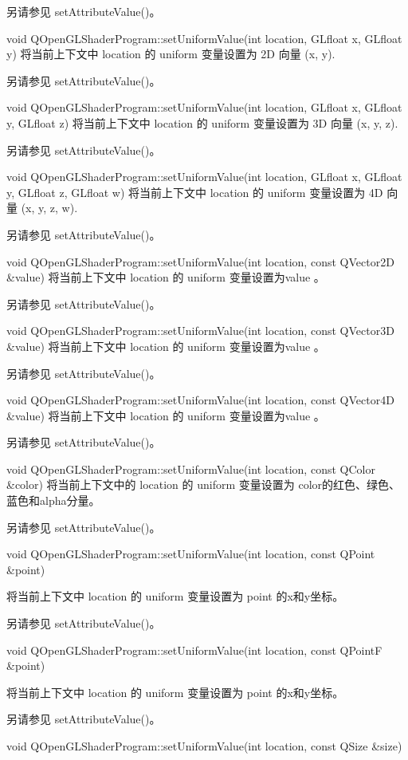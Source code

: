 另请参见 setAttributeValue()。

void QOpenGLShaderProgram::setUniformValue(int location, GLfloat x, GLfloat y)
将当前上下文中 location 的 uniform 变量设置为 2D 向量 (x, y).

另请参见 setAttributeValue()。

void QOpenGLShaderProgram::setUniformValue(int location, GLfloat x, GLfloat y, GLfloat z)
将当前上下文中 location 的 uniform 变量设置为 3D 向量 (x, y, z).

另请参见 setAttributeValue()。

void QOpenGLShaderProgram::setUniformValue(int location, GLfloat x, GLfloat y, GLfloat z, GLfloat w)
将当前上下文中 location 的 uniform 变量设置为 4D 向量 (x, y, z, w).

另请参见 setAttributeValue()。

void QOpenGLShaderProgram::setUniformValue(int location, const QVector2D \&value)
将当前上下文中 location 的 uniform 变量设置为value 。

另请参见 setAttributeValue()。

void QOpenGLShaderProgram::setUniformValue(int location, const QVector3D \&value)
将当前上下文中 location 的 uniform 变量设置为value 。

另请参见 setAttributeValue()。

void QOpenGLShaderProgram::setUniformValue(int location, const QVector4D \&value)
将当前上下文中 location 的 uniform 变量设置为value 。

另请参见 setAttributeValue()。

void QOpenGLShaderProgram::setUniformValue(int location, const QColor \&color)
将当前上下文中的 location 的 uniform 变量设置为 color的红色、绿色、蓝色和alpha分量。

另请参见 setAttributeValue()。

void QOpenGLShaderProgram::setUniformValue(int location, const QPoint \&point)

将当前上下文中 location 的 uniform 变量设置为 point 的x和y坐标。

另请参见 setAttributeValue()。

void QOpenGLShaderProgram::setUniformValue(int location, const QPointF \&point)


将当前上下文中 location 的 uniform 变量设置为 point 的x和y坐标。

另请参见 setAttributeValue()。

void QOpenGLShaderProgram::setUniformValue(int location, const QSize \&size)

